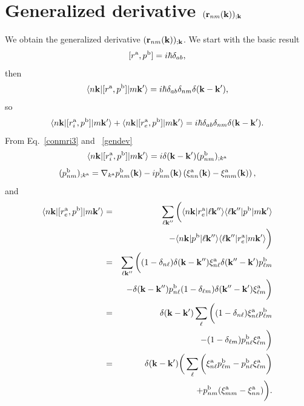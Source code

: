\documentclass[floatfix,prb,aps,superscriptaddress,11pt,preprint]{revtex4}
\begin{document}
\section{Generalized derivative $(\mathbf{r}_{nm}(\mathbf{k}))_{;\mathbf{k}}$}\label{gder}

We obtain the generalized derivative $(\mathbf{r}_{nm}(\mathbf{k}))_{;\mathbf{k}}$.
We start with the basic result
\begin{equation}\label{a_hrdab}
[r^{\mathrm{a}},p^{\mathrm{b}}]=i\hbar\delta_{ab}
,
\end{equation}
then
\begin{equation}\label{a_hrdab2}
\langle n\mathbf{k} |[r^{\mathrm{a}},p^{\mathrm{b}}]| m\mathbf{k}' \rangle=i\hbar\delta_{ab}\delta_{nm}\delta(\mathbf{k}-\mathbf{k}')
,
\end{equation}
so
\begin{equation}\label{a_hrdab3}
\langle n\mathbf{k} |[r^{\mathrm{a}}_i,p^{\mathrm{b}}]| m\mathbf{k}' \rangle
+
\langle n\mathbf{k} |[r^{\mathrm{a}}_e,p^{\mathrm{b}}]| m\mathbf{k}' \rangle
=i\hbar\delta_{ab}\delta_{nm}\delta(\mathbf{k}-\mathbf{k}')
.
\end{equation}
From Eq.~\eqref{conmri3} and ~\eqref{gendev}
\begin{equation}\label{a_rip}
\langle n\mathbf{k} |[r^{\mathrm{a}}_i,p^{\mathrm{b}}]| m\mathbf{k}' \rangle
=i\delta(\mathbf{k}-\mathbf{k}')(p^{\mathrm{b}}_{nm})_{;k^{\mathrm{a}}}
\end{equation}
\begin{equation}\label{a_ripn}
(p^{\mathrm{b}}_{nm})_{;k^{\mathrm{a}}}=
\nabla_{k^{\mathrm{a}}}
p^{\mathrm{b}}_{n m}(\mathbf{k})
-
i
p^{\mathrm{b}}_{nm}(\mathbf{k})
\left(
\xi^{\mathrm{a}}_{nn}(\mathbf{k})
-
\xi^{\mathrm{a}}_{mm}(\mathbf{k})
\right)
,
\end{equation}
and
\begin{eqnarray}\label{a_rep}
\langle n\mathbf{k} |[r^{\mathrm{a}}_e,p^{\mathrm{b}}]| m\mathbf{k}' \rangle&=&
\sum_{\ell\mathbf{k}''}
\bigg(
\langle n\mathbf{k} |r^{\mathrm{a}}_e| \ell\mathbf{k}'' \rangle\langle \ell\mathbf{k}'' |p^{\mathrm{b}}| m\mathbf{k}' \rangle
\nonumber \\
&&
-
\langle n\mathbf{k} |p^{\mathrm{b}}| \ell\mathbf{k}'' \rangle\langle \ell\mathbf{k}'' |r^{\mathrm{a}}_e| m\mathbf{k}' \rangle
\bigg)
\nonumber \\
&=&
\sum_{\ell\mathbf{k}''}
\bigg(
(1-\delta_{n\ell})\delta(\mathbf{k}-\mathbf{k}'')\xi^{\mathrm{a}}_{n\ell}
\delta(\mathbf{k}''-\mathbf{k}')p^{\mathrm{b}}_{\ell m}
\nonumber \\
&&-
\delta(\mathbf{k}-\mathbf{k}'')p^{\mathrm{b}}_{n\ell}
(1-\delta_{\ell m})\delta(\mathbf{k}''-\mathbf{k}')\xi^{\mathrm{a}}_{\ell m}
\bigg)
\nonumber \\
&=&
\delta(\mathbf{k}-\mathbf{k}')
\sum_{\ell}
\bigg(
(1-\delta_{n\ell})
\xi^{\mathrm{a}}_{n\ell}
p^{\mathrm{b}}_{\ell m}
\nonumber \\
&&-
(1-\delta_{\ell m})
p^{\mathrm{b}}_{n\ell}
\xi^{\mathrm{a}}_{\ell m}
\bigg)
\nonumber \\
&=&
\delta(\mathbf{k}-\mathbf{k}')
\bigg(
\sum_{\ell}
\bigg(
\xi^{\mathrm{a}}_{n\ell}
p^{\mathrm{b}}_{\ell m}
-
p^{\mathrm{b}}_{n\ell}
\xi^{\mathrm{a}}_{\ell m}
\bigg)
\nonumber \\
&&+
p^{\mathrm{b}}_{nm}(\xi^{\mathrm{a}}_{mm}
-
\xi^{\mathrm{a}}_{nn}
)
\bigg)
.
\end{eqnarray}
\end{document}
